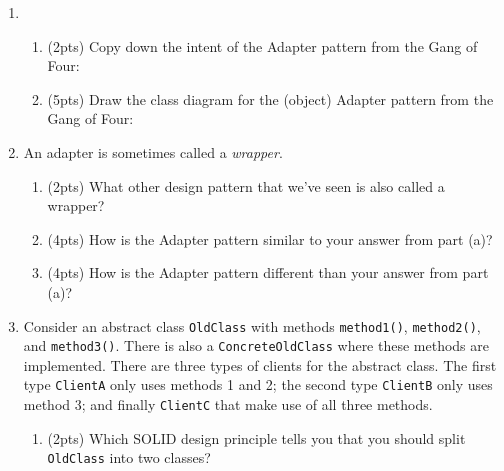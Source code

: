 \documentclass[11pt]{article}
\begin{document}
\begin{enumerate}
 \vfill

\newpage 

  \item 

  \begin{enumerate}

    \item (2pts) Copy down the intent of the Adapter pattern from the Gang of Four:

    \vspace{0.5in}

    \item (5pts) Draw the class diagram for the (object) Adapter pattern from the Gang of Four:

    \vfill
    \vfill

  \end{enumerate}

  \item An adapter is sometimes called a \emph{wrapper}.

  \begin{enumerate}

    \item (2pts) What other design pattern that we've seen is also called a wrapper?

    \vspace{0.5in}

    \item (4pts) How is the Adapter pattern similar to your answer from part (a)?

    \vfill

    \item (4pts) How is the Adapter pattern different than your answer from part (a)?

    \vfill

  \end{enumerate}

\newpage

  \item Consider an abstract class \texttt{OldClass} with methods \texttt{method1()}, \texttt{method2()}, and \texttt{method3()}. There is also a \texttt{ConcreteOldClass} where these methods are implemented. There are three types of clients for the abstract class. The first type \texttt{ClientA} only uses methods 1 and 2; the second type \texttt{ClientB} only uses method 3; and finally \texttt{ClientC} that make use of all three methods. 

  \begin{enumerate}
    \item (2pts) Which SOLID design principle tells you that you should split \texttt{OldClass} into two classes?


\end{enumerate}
\end{enumerate}
\end{document}
